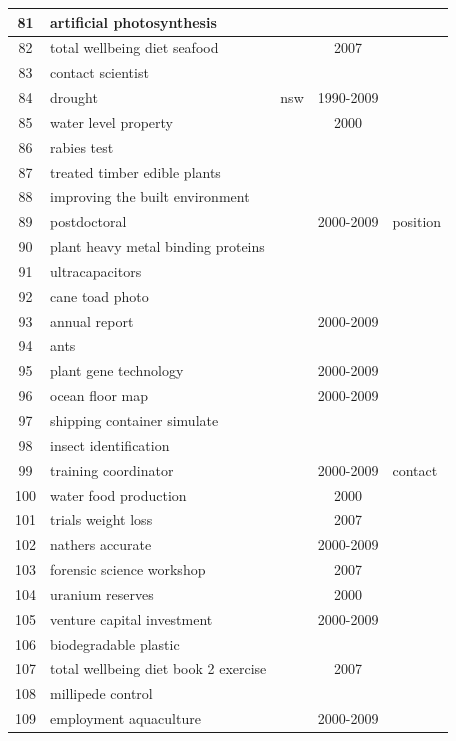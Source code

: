 \begin{center}
\begin{longtable}{c|p{3cm}|c|c|p{3cm}}
81 & artificial photosynthesis &  &  &  \\ \hline
82 & total wellbeing diet seafood &  & 2007 &  \\ \hline
83 & contact scientist &  &  &  \\ \hline
84 & drought & nsw & 1990-2009 &  \\ \hline
85 & water level property &  & 2000 &  \\ \hline
86 & rabies test &  &  &  \\ \hline
87 & treated timber edible plants &  &  &  \\ \hline
88 & improving the built environment &  &  &  \\ \hline
89 & postdoctoral &  & 2000-2009 & position \\ \hline
90 & plant heavy metal binding proteins &  &  &  \\ \hline
91 & ultracapacitors &  &  &  \\ \hline
92 & cane toad photo &  &  &  \\ \hline
93 & annual report &  & 2000-2009 &  \\ \hline
94 & ants &  &  &  \\ \hline
95 & plant gene technology &  & 2000-2009 &  \\ \hline
96 & ocean floor map &  & 2000-2009 &  \\ \hline
97 & shipping container simulate &  &  &  \\ \hline
98 & insect identification &  &  &  \\ \hline
99 & training coordinator &  & 2000-2009 & contact \\ \hline
100 & water food production &  & 2000 &  \\ \hline
101 & trials weight loss &  & 2007 &  \\ \hline
102 & nathers accurate &  & 2000-2009 &  \\ \hline
103 & forensic science workshop &  & 2007 &  \\ \hline
104 & uranium reserves &  & 2000 &  \\ \hline
105 & venture capital investment &  & 2000-2009 &  \\ \hline
106 & biodegradable plastic &  &  &  \\ \hline
107 & total wellbeing diet book 2 exercise &  & 2007 &  \\ \hline
108 & millipede control &  &  &  \\ \hline
109 & employment aquaculture &  & 2000-2009 &  \\ \hline

\end{longtable}
\end{center}
